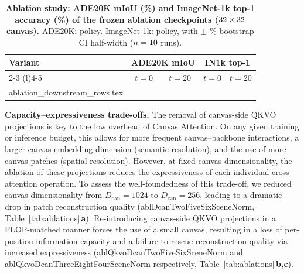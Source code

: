 \documentclass{article}
\makeatletter
\newcommand{\inputrows}[1]{\@@input #1 }
\newcommand{\abldelta}[2]{\csname abl#1#2\endcsname}
\makeatother
\begin{document}
\begin{table}[t]
  \caption{\textbf{Ablation study: ADE20K mIoU (\%) and ImageNet-1k top-1 accuracy (\%) of the frozen ablation checkpoints ($32 \times 32$ canvas).}
  ADE20K: \ablDownstreamSegPolicy{} policy. ImageNet-1k: \ablDownstreamClfPolicy{} policy, with $\pm$ \bootstrapCiPct\% bootstrap CI half-width ($n = 10$ runs).}
  \label{tab:ablation-downstream}
  \centering
  \small
  \begin{tabular}{lcccc}
    \toprule
    \multirow{2}{*}{\textbf{Variant}}
      & \multicolumn{2}{c}{\textbf{ADE20K mIoU}}
      & \multicolumn{2}{c}{\textbf{IN1k top-1}} \\
    \cmidrule(l){2-3} \cmidrule(l){4-5}
    & $t = 0$ & $t = 20$ & $t = 0$ & $t = 20$ \\
    \midrule
    \inputrows{ablation_downstream_rows.tex}
    \bottomrule
  \end{tabular}
\end{table}

\textbf{Capacity--expressiveness trade-offs.}
The removal of canvas-side QKVO projections is key to the low overhead of Canvas Attention.
On any given training or inference budget, this allows for more frequent canvas--backbone interactions, a larger canvas embedding dimension (semantic resolution), and the use of more canvas patches (spatial resolution).
However, at fixed canvas dimensionality, the ablation of these projections reduces the expressiveness of each individual cross-attention operation.
To assess the well-foundedness of this trade-off, we reduced canvas dimensionality from $D_{\mathrm{can}} = 1024$ to $D_{\mathrm{can}} = 256$, leading to a dramatic drop in patch reconstruction quality (\abldelta{DcanTwoFiveSix}{SceneNorm}, Table~\ref{tab:ablations}\,\textbf{a}).
Re-introducing canvas-side QKVO projections in a FLOP-matched manner forces the use of a small canvas, resulting in a loss of per-position information capacity and a failure to rescue reconstruction quality via increased expressiveness (\abldelta{QkvoDcanTwoFiveSix}{SceneNorm} and \abldelta{QkvoDcanThreeEightFour}{SceneNorm} respectively, Table~\ref{tab:ablations}\,\textbf{b,c}).
\end{document}
